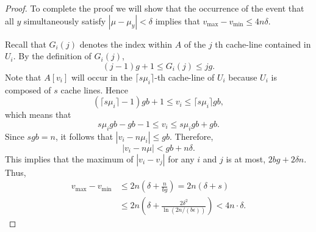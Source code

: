 \documentclass[sigplan, 10pt, nonacm]{acmart}
\newcommand{\alek}[1]{\textcolor{red}{#1}}
\theoremstyle{remark}
\theoremstyle{remark}
\begin{document}
\begin{proof}


To complete the proof we will show that the occurrence of the event
that all $y$ simultaneously satisfy $|\mu - \mu_y| < \delta$ implies
that $v_{\text{max}} - v_{\text{min}} \le 4n\delta$.




  Recall that $G_i(j)$ denotes the index within $A$ of the $j$ th cache-line contained in $U_i$. By the definition of $G_i(j)$, $$(j - 1)g + 1 \le G_i(j) \le jg.$$ Note that $A[v_i]$ will occur in the $\lceil s\mu_i \rceil$-th cache-line of $U_i$ because $U_i$ is composed of $s$ cache lines. Hence $$(\lceil s\mu_i \rceil - 1) g b + 1 \le v_i \le \lceil s\mu_i \rceil g b,$$
  which means that
  $$s\mu_i g b - gb - 1 \le v_i \le s\mu_i g b + gb.$$ Since $sgb =
  n$, it follows that $|v_i - n \mu_i| \le gb$. Therefore,
  $$|v_i - n \mu| < gb + n\delta.$$
  This
implies that the maximum of $|v_i - v_j|$ for
any $i$ and $j$ is at most, $2bg + 2\delta n$. Thus,
\begin{align*}
  v_{\text{max}} - v_{\text{min}} & \le 2n \left( \delta + \frac{n}{bg} \right)  = 2n \left( \delta + s \right) \\
  & \le 2n \left(\delta + \frac{2\delta^2}{\ln (2n / (b\epsilon))}\right) < 4n\cdot\delta.
\end{align*}
\end{proof}
\end{document}
